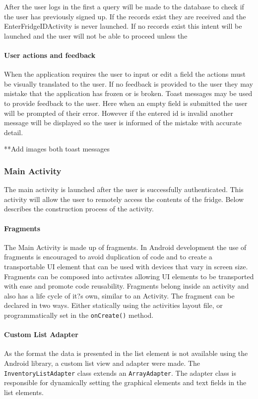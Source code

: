 \documentclass[a4paper, 11pt]{article}
\begin{document}
After the user logs in the first a query will be made to the database to check if the user has previously signed up. If the records exist they are received and the EnterFridgeIDActivity is never launched. If no records exist this intent will be launched and the user will not be able to proceed unless the 

\paragraph{User actions and feedback}
When the application requires the user to input or edit a field the actions must be visually translated to the user. If no feedback is provided to the user they may mistake that the application has frozen or is broken. Toast messages may be used to provide feedback to the user. Here when an empty field is submitted the user will be prompted of their error. However if the entered id is invalid another message will be displayed so the user is informed of the mistake with accurate detail. 

**Add images both toast messages

\subsubsection{Main Activity}
The main activity is launched after the user is successfully authenticated. This activity will allow the user to remotely access the contents of the fridge. Below describes the construction process of the activity. 

\paragraph{Fragments} The Main Activity is made up of fragments. In Android development the use of fragments is encouraged to avoid duplication of code and to create a transportable UI element that can be used with devices that vary in screen size. Fragments can be composed into activates allowing UI elements to be transported with ease and promote code reusability. Fragments belong inside an activity and also has a life cycle of it?s own, similar to an Activity. The fragment can be declared in two ways. Either statically using the activities layout file, or programmatically set in the \texttt{onCreate()} method.  	

\paragraph{Custom List Adapter} 
As the format the data is presented in the list element is not available using the Android library, a custom list view and adapter were made. The \texttt{InventoryListAdapter} class extends an \texttt{ArrayAdapter}. The adapter class is responsible for dynamically setting the graphical elements and text fields in the list elements. 
\end{document}
